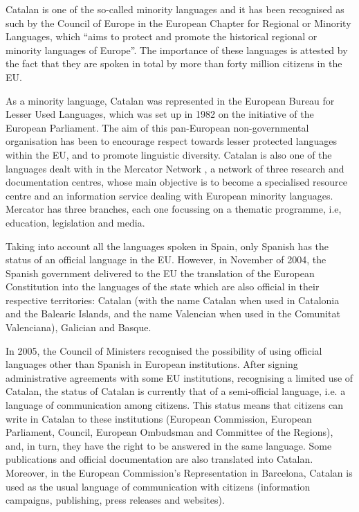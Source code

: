 \begin{multicols}{2}
Catalan is one of the so-called minority languages and it has been recognised as such by the Council of Europe in the European Chapter for Regional or Minority Languages, which “aims to protect and promote the historical regional or minority languages of Europe”. The importance of these languages is attested by the fact that they are spoken in total by more than forty million citizens in the EU.

As a minority language, Catalan was represented in the European Bureau for Lesser Used Languages, which was set up in 1982 on the initiative of the European Parliament. The aim of this pan-European non-governmental organisation has been to encourage respect towards lesser protected languages within the EU, and to promote linguistic diversity. Catalan is also one of the languages dealt with in the Mercator Network \cite{CAT-Nota8}, a network of three research and documentation centres, whose main objective is to become a specialised resource centre and an information service dealing with European minority languages. Mercator has three branches, each one focus\-sing on a thematic programme, i.e, education, legislation and media.

Taking into account all the languages spoken in Spain, only Spanish has the status of an official language in the EU.  However, in November of 2004, the Spanish government delivered to the EU the translation of the European Constitution into the languages of the state which are also official in their respective territories: Catalan (with the name Catalan when used in Catalonia and the Balearic Islands, and the name Valencian when used in the Comunitat Valenciana), Galician and Basque. 

In 2005, the Council of Ministers recognised the possibility of using official languages other than Spanish in European institutions. After signing administrative agreements with some EU institutions, recognising a limited use of Catalan, the status of Catalan is currently that of a semi-official language, i.e. a language of communication among citizens. This status means that citizens can write in Catalan to these institutions (European Commission, European Parliament, Council, European Ombudsman and Committee of the Regions), and, in turn, they have the right to be answered in the same language. Some publications and official documentation are also translated into Catalan. Moreover, in the European Commission’s Representation in Barcelona, Catalan is used as the usual language of communication with citizens (information campaigns, publishing, press releases and websites).


\end{multicols}
